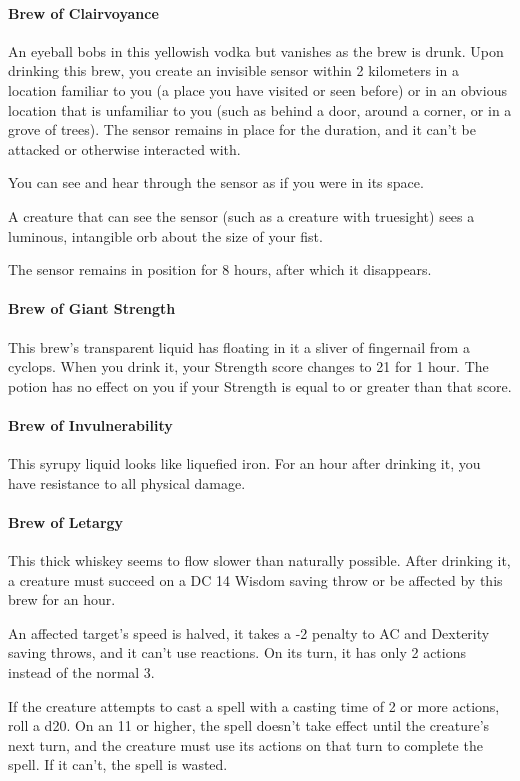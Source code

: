     \paragraph{Brew of Clairvoyance} %
        An eyeball bobs in this yellowish vodka but vanishes as the brew is drunk.
        Upon drinking this brew, you create an invisible sensor within 2 kilometers in a location familiar to you (a place you have visited or seen before) or in an obvious location that is unfamiliar to you (such as behind a door, around a corner, or in a grove of trees).
        The sensor remains in place for the duration, and it can't be attacked or otherwise interacted with.

        You can see and hear through the sensor as if you were in its space.

        A creature that can see the sensor (such as a creature with truesight) sees a luminous, intangible orb about the size of your fist.

        The sensor remains in position for 8 hours, after which it disappears.
    \paragraph{Brew of Giant Strength}
        This brew's transparent liquid has floating in it a sliver of fingernail from a cyclops.
        When you drink it, your Strength score changes to 21 for 1 hour.
        The potion has no effect on you if your Strength is equal to or greater than that score.
    \paragraph{Brew of Invulnerability}
        This syrupy liquid looks like liquefied iron.
        For an hour after drinking it, you have resistance to all physical damage.
    \paragraph{Brew of Letargy} %
        This thick whiskey seems to flow slower than naturally possible.
        After drinking it, a creature must succeed on a DC 14 Wisdom saving throw or be affected by this brew for an hour.

        An affected target's speed is halved, it takes a -2 penalty to AC and Dexterity saving throws, and it can't use reactions.
        On its turn, it has only 2 actions instead of the normal 3.

        If the creature attempts to cast a spell with a casting time of 2 or more actions, roll a d20.
        On an 11 or higher, the spell doesn't take effect until the creature's next turn, and the creature must use its actions on that turn to complete the spell.
        If it can't, the spell is wasted.

